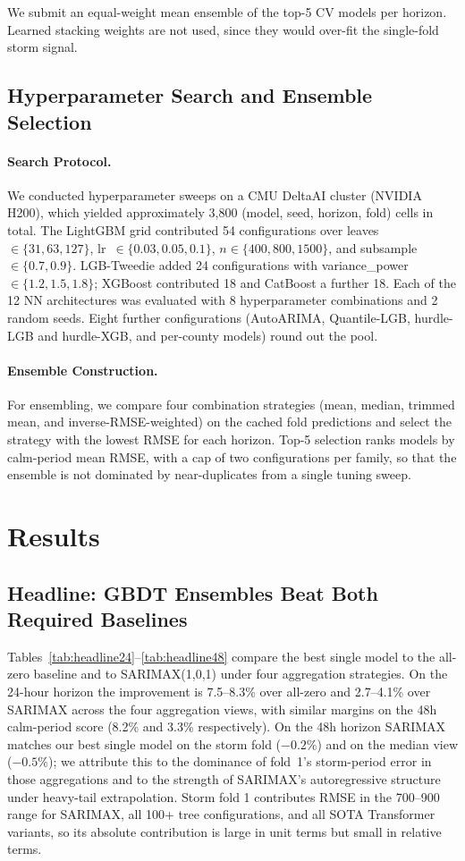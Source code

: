 \documentclass[11pt]{article}
\begin{document}
We submit an equal-weight mean ensemble of the top-5 CV models per horizon. Learned stacking weights are not used, since they would over-fit the single-fold storm signal.

\subsection{Hyperparameter Search and Ensemble Selection}

\paragraph{Search Protocol.}
We conducted hyperparameter sweeps on a CMU DeltaAI cluster (NVIDIA H200), which yielded approximately 3{,}800 (model, seed, horizon, fold) cells in total. The LightGBM grid contributed 54 configurations over leaves~$\in\{31,63,127\}$, lr~$\in\{0.03,0.05,0.1\}$, $n\in\{400,800,1500\}$, and subsample~$\in\{0.7,0.9\}$. LGB-Tweedie added 24 configurations with variance\_power $\in\{1.2,1.5,1.8\}$; XGBoost contributed 18 and CatBoost a further 18. Each of the 12 NN architectures was evaluated with 8 hyperparameter combinations and 2 random seeds. Eight further configurations (AutoARIMA, Quantile-LGB, hurdle-LGB and hurdle-XGB, and per-county models) round out the pool. 

\paragraph{Ensemble Construction.}
For ensembling, we compare four combination strategies (mean, median, trimmed mean, and inverse-RMSE-weighted) on the cached fold predictions and select the strategy with the lowest RMSE for each horizon. Top-5 selection ranks models by calm-period mean RMSE, with a cap of two configurations per family, so that the ensemble is not dominated by near-duplicates from a single tuning sweep.

\section{Results}
\label{sec:results}

\subsection{Headline: GBDT Ensembles Beat Both Required Baselines}
Tables~\ref{tab:headline24}--\ref{tab:headline48} compare the best
single model to the all-zero baseline and to SARIMAX(1,0,1) under four
aggregation strategies. On the 24-hour horizon the improvement is
7.5--8.3\% over all-zero and 2.7--4.1\% over SARIMAX across the four
aggregation views, with similar margins on the 48h calm-period score
(8.2\% and 3.3\% respectively). On the 48h horizon SARIMAX matches our
best single model on the storm fold ($-0.2\%$) and on the median view
($-0.5\%$); we attribute this to the dominance of fold~1's storm-period
error in those aggregations and to the strength of SARIMAX's
autoregressive structure under heavy-tail extrapolation. Storm fold 1
contributes RMSE in the 700--900 range for SARIMAX, all 100+ tree
configurations, and all SOTA Transformer variants, so its absolute
contribution is large in unit terms but small in relative terms.
\end{document}
